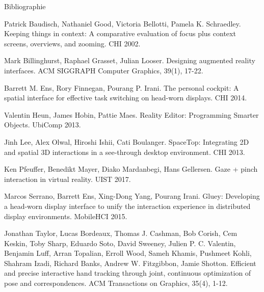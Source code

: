 \begin{frame}[allowframebreaks]{Bibliographie}
  \begin{thebibliography}{10}
      Patrick Baudisch, Nathaniel Good, Victoria Bellotti, Pamela K. Schraedley.
      \newblock Keeping things in context: A comparative evaluation of focus plus context screens, overviews, and zooming.
      \newblock CHI 2002.

      Mark Billinghurst, Raphael Grasset, Julian Looser.
      \newblock Designing augmented reality interfaces.
      \newblock ACM SIGGRAPH Computer Graphics, 39(1), 17-22.

      Barrett M. Ens, Rory Finnegan, Pourang P. Irani.
      \newblock The personal cockpit: A spatial interface for effective task switching on head-worn displays.
      \newblock CHI 2014.

      Valentin Heun, James Hobin, Pattie Maes.
      \newblock Reality Editor: Programming Smarter Objects.
      \newblock UbiComp 2013.

      Jinh Lee, Alex Olwal, Hiroshi Ishii, Cati Boulanger.
      \newblock SpaceTop: Integrating 2D and spatial 3D interactions in a see-through desktop environment.
      \newblock CHI 2013.

      Ken Pfeuffer, Benedikt Mayer, Diako Mardanbegi, Hans Gellersen.
      \newblock Gaze + pinch interaction in virtual reality.
      \newblock UIST 2017.

      Marcos Serrano, Barrett Ens, Xing-Dong Yang, Pourang Irani.
      \newblock Gluey: Developing a head-worn display interface to unify the interaction experience in distributed display environments.
      \newblock MobileHCI 2015.

      Jonathan Taylor, Lucas Bordeaux, Thomas J. Cashman, Bob Corish, Cem Keskin, Toby Sharp, Eduardo Soto, David Sweeney, Julien P. C. Valentin, Benjamin Luff, Arran Topalian, Erroll Wood, Sameh Khamis, Pushmeet Kohli, Shahram Izadi, Richard Banks, Andrew W. Fitzgibbon, Jamie Shotton.
      \newblock Efficient and precise interactive hand tracking through joint, continuous optimization of pose and correspondences.
      \newblock ACM Transactions on Graphics, 35(4), 1-12.
  \end{thebibliography}
\end{frame}